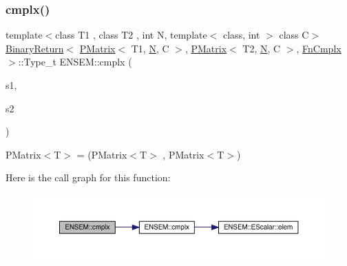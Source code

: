 \subsubsection{\texorpdfstring{cmplx()}{cmplx()}}
{\footnotesize\ttfamily template$<$class T1 , class T2 , int N, template$<$ class, int $>$ class C$>$ \\
\mbox{\hyperlink{structENSEM_1_1BinaryReturn}{Binary\+Return}}$<$ \mbox{\hyperlink{classENSEM_1_1PMatrix}{P\+Matrix}}$<$ T1, \mbox{\hyperlink{operator__name__util_8cc_a7722c8ecbb62d99aee7ce68b1752f337}{N}}, C $>$, \mbox{\hyperlink{classENSEM_1_1PMatrix}{P\+Matrix}}$<$ T2, \mbox{\hyperlink{operator__name__util_8cc_a7722c8ecbb62d99aee7ce68b1752f337}{N}}, C $>$, \mbox{\hyperlink{structENSEM_1_1FnCmplx}{Fn\+Cmplx}} $>$\+::Type\+\_\+t E\+N\+S\+E\+M\+::cmplx (\begin{DoxyParamCaption}\item[{const \mbox{\hyperlink{classENSEM_1_1PMatrix}{P\+Matrix}}$<$ T1, \mbox{\hyperlink{operator__name__util_8cc_a7722c8ecbb62d99aee7ce68b1752f337}{N}}, C $>$ \&}]{s1,  }\item[{const \mbox{\hyperlink{classENSEM_1_1PMatrix}{P\+Matrix}}$<$ T2, \mbox{\hyperlink{operator__name__util_8cc_a7722c8ecbb62d99aee7ce68b1752f337}{N}}, C $>$ \&}]{s2 }\end{DoxyParamCaption})\hspace{0.3cm}{\ttfamily [inline]}}



P\+Matrix$<$\+T$>$ = (P\+Matrix$<$\+T$>$ , P\+Matrix$<$\+T$>$) 

Here is the call graph for this function\+:\nopagebreak
\begin{figure}[H]
\begin{center}
\leavevmode
\includegraphics[width=350pt]{df/d0a/group__primmatrix_ga895c61e14c8d4206a949f44e36add5c6_cgraph}
\end{center}
\end{figure}
\mbox{\label{group__primmatrix_gabbacb7d7e40fcf5d0bcd18aa907d33ea}} 
